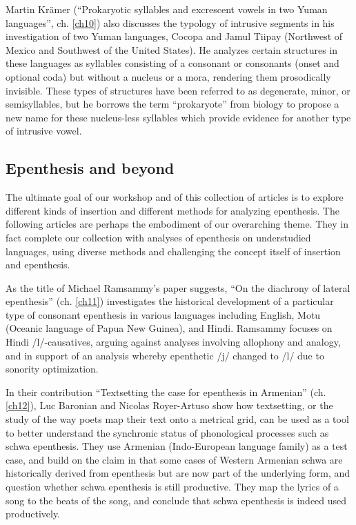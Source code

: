 \documentclass[output=paper,colorlinks,citecolor=brown]{langscibook}
\begin{document}
Martin Krämer (“Prokaryotic syllables and excrescent vowels in two Yuman languages”, ch. \ref{ch10}) also discusses the typology of intrusive segments in his investigation of two Yuman languages, Cocopa and Jamul Tiipay (Northwest of Mexico and Southwest of the United States). He analyzes certain structures in these languages as syllables consisting of a consonant or consonants (onset and optional coda) but without a nucleus or a mora, rendering them prosodically invisible. These types of structures have been referred to as degenerate, minor, or semisyllables, but he borrows the term “prokaryote” from biology to propose a new name for these nucleus-less syllables which provide evidence for another type of intrusive vowel.

\subsection{Epenthesis and beyond}
The ultimate goal of our workshop and of this collection of articles is to explore different kinds of insertion and different methods for analyzing epenthesis. The following articles are perhaps the embodiment of our overarching theme. They in fact complete our collection with analyses of epenthesis on understudied languages, using diverse methods and challenging the concept itself of insertion and epenthesis. 

As the title of Michael Ramsammy’s paper suggests, “On the diachrony of lateral epenthesis” (ch. \ref{ch11}) investigates the historical development of a particular type of consonant epenthesis in various languages including English, Motu (Oceanic language of Papua New Guinea), and Hindi. Ramsammy focuses on Hindi /l/-causatives, arguing against analyses involving allophony and analogy, and in support of an analysis whereby epenthetic /j/ changed to /l/ due to sonority optimization.

In their contribution “Textsetting the case for epenthesis in Armenian” (ch. \ref{ch12}), Luc Baronian and Nicolas Royer-Artuso show how textsetting, or the study of the way poets map their text onto a metrical grid, can be used as a tool to better understand the synchronic status of phonological processes such as schwa epenthesis. They use Armenian (Indo-European language family) as a test case, and build on the claim in \citet{Baronian2017} that some cases of Western Armenian schwa are historically derived from epenthesis but are now part of the underlying form, and question whether schwa epenthesis is still productive. They map the lyrics of a song to the beats of the song, and conclude that schwa epenthesis is indeed used productively.
\end{document}
